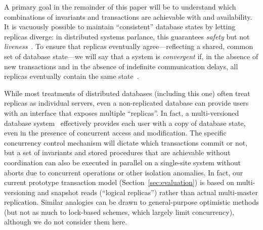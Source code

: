 A primary goal in the remainder of this paper will be to understand
which combinations of invariants and transactions are achievable with
\cfreedom and availability. It is vacuously possible to maintain
``consistent'' database states by letting replicas diverge: in
distributed systems parlance, this guarantees \textit{safety} but not
\textit{liveness}~\cite{lamport-safety}. To ensure that replicas
eventually agree---reflecting a shared, common set of database
state---we will say that a system is \textit{convergent} if, in the
absence of new transactions and in the absence of indefinite
communication delays, all replicas eventually contain the same
state~\cite{vogels-defs}.

 While most treatments of
distributed databases (including this one) often treat replicas as
individual servers, even a non-replicated database can provide users
with an interface that exposes multiple ``replicas''. In fact, a
multi-versioned database system~\cite{bernstein-book} effectively
provides each user with a copy of database state, even in the presence
of concurrent access and modification. The specific concurrency
control mechanism will dictate which transactions commit or not, but a
set of invariants and stored procedures that are achievable without
coordination can also be executed in parallel on a single-site system
without aborts due to concurrent operations or other isolation
anomalies.  In fact, our current prototype transaction model
(Section~\ref{sec:evaluation}) is based on multi-versioning and
snapshot reads (``logical replicas'') rather than actual multi-master
replication. Similar analogies can be drawn to general-purpose
optimistic methods (but not as much to lock-based schemes, which
largely limit concurrency), although we do not consider them here.

